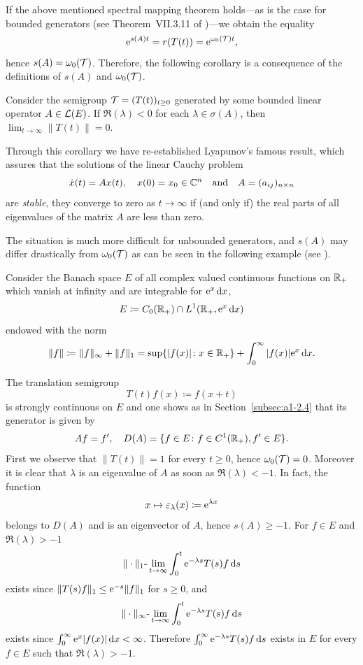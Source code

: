 If the above mentioned spectral mapping theorem holds---as is the case for bounded generators (\eg see Theorem~VII.3.11 of \textcite{dunfordschwartz:1958})---we obtain the equality
\[
    \mathrm{e}^{s(A)t} = r(T(t)) = \mathrm{e}^{\omega_{0}(\mathcal{T}) t} ,
\]
hence $s(A) = \omega_{0}(\mathcal{T})$.
Therefore, the following corollary is a consequence of the definitions of\/ $s(A)$ and $\omega_{0}(\mathcal{T})$.
\begin{corollary}\label{cor:a3-1.2}
Consider the semigroup $\TT = (T(t))_{t \geq 0}$ generated by some bounded linear operator $A \in \mathcal{L}(E)$.
If\/ $\Re(\lambda) < 0$ for each $\lambda \in \sigma(A)$, then 
\mbox{$\lim_{t \to \infty}\|T(t)\| = 0$.}
\end{corollary}
Through this corollary we have re-established Lyapunov's  famous result, which assures that the solutions of the linear Cauchy problem
\[
    \dot{x}(t) = Ax(t), \quad x(0) = x_{0} \in \mathbb{C}^{n} \quad \text{and} \quad A = (a_{ij})_{n\times n}
\]
are \emph{stable}, \ie they converge to zero as $t \to \infty$ if (and only if) the real parts of all eigenvalues of the matrix $A$ are less than zero.

The situation is much more difficult for unbounded generators, and $s(A)$ may differ drastically from $\omega_{0}(\mathcal{T})$ as can be seen in the following example (see \textcite{greinervoigtwolff:1981}).
\begin{example}\label{ex:a3-1.3}
Consider the Banach space $E$ of all complex valued continuous functions on $\mathbb{R}_{+}$ which vanish at infinity and are integrable for $\mathrm{e}^{x}\mathop{}\!\mathrm{d}{x}$, \ie 
\[
    E \coloneq C_{0}(\mathbb{R}_{+}) \cap L^{1}(\mathbb{R}_{+}, \mathrm{e}^{x}\mathop{}\!\mathrm{d}{x})
\]
endowed with the norm
\[
    \|f\| \coloneq \|f\|_{\infty} + \|f\|_{1} = \sup\{|f(x)| \colon x \in \mathbb{R}_{+}\} + \int_{0}^{\infty} |f(x)|\mathrm{e}^{x} \mathop{}\!\mathrm{d}{x} .
\]
\end{example}
The translation semigroup
\[
    T(t)f(x) \coloneq f(x+t)
\]
is strongly continuous on $E$ and one shows as in Section~\ref{subsec:a1-2.4} that its generator is given by
\[
    Af = f', \quad D(A) = \{ f \in E \colon f \in C^{1}(\mathbb{R}_{+}), f' \in E \} .
\]
First we observe that $\|T(t)\| = 1$ for every $t \geq 0$, hence $\omega_{0}(\mathcal{T}) = 0$.
Moreover it is clear that $\lambda$ is an eigenvalue of\/ $A$ as soon as $\Re(\lambda) < -1$. In fact, the function
\[
    x \mapsto \epsilon_{\lambda}(x) \coloneq \eu^{\lambda x}
\]
belongs to $D(A)$ and is an eigenvector of\/ $A$, hence $s(A) \geq -1$.
For $f \in E$ and $\Re(\lambda) > -1$ 
\[
    \|\cdot\|_{1}\text{-}\lim_{t \to \infty} \int_{0}^{t} \mathrm{e}^{-\lambda s}T(s)f \mathop{}\!\mathrm{d}{s}
\]
exists since $\|T(s)f\|_{1} \leq \eu^{-s}\|f\|_{1}$ for $s \geq 0$, and
\[
    \|\cdot\|_{\infty}\text{-}\lim_{t \to \infty} \int_{0}^{t} \mathrm{e}^{-\lambda s}T(s)f \mathop{}\!\mathrm{d}{s}
\]
exists since $\int_{0}^{\infty} \mathrm{e}^{x}|f(x)| \mathop{}\!\mathrm{d}{x} < \infty$.
Therefore $\int_{0}^{\infty} \mathrm{e}^{-\lambda s}T(s)f \mathop{}\!\mathrm{d}{s}$ exists in $E$ for every $f \in E$ such that $\Re(\lambda) > -1$.

